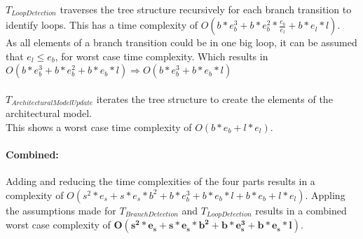 \documentclass[10pt,a4paper]{article}
\begin{document}
	\\
	$T_{LoopDetection}$ traverses the tree structure recursively for each branch transition to identify loops. This has a time complexity of $O(b*e_b^{3} + b*e_b^{2}*\frac{e_b}{e_l} + b*e_l*l)$.\\
	As all elements of a branch transition could be in one big loop, it can be assumed that $e_l \leq e_b$, for worst case time complexity. Which results in $O(b*e_b^{3} + b*e_b^{2} + b*e_b*l) \Rightarrow O(b*e_b^{3} + b*e_b*l)$\\
	\\
	$T_{ArchitecturalModelUpdate}$ iterates the tree structure to create the elements of the architectural model.\\
	This shows a worst case time complexity of $O(b*e_b + l*e_l)$.
	
	\paragraph{Combined:}
	Adding and reducing the time complexities of the four parts results in a complexity of $O(s^2*e_s + s*e_s*b^2 + b*e_b^{3} + b*e_b*l + b*e_b + l*e_l)$. Appling the assumptions made for $T_{BranchDetection}$ and $T_{LoopDetection}$ results in a combined worst case complexity of $\mathbf{O(s^2*e_s + s*e_s*b^2 + b*e_s^{3} + b*e_s*l)}$.
	
\end{document}
